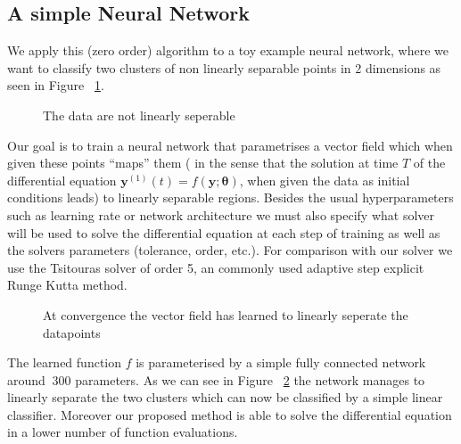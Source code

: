 \documentclass[11pt]{report}
\begin{document}
    \subsection{A simple Neural Network}
    We apply this (zero order) algorithm to a toy example neural network, where we want to classify two clusters of
    non linearly separable points in 2 dimensions as seen in Figure ~\ref{fig:moons}.

    \begin{figure}[H]
        \begin{center}
            \resizebox{\textwidth}{!}{  }
        \end{center}
        \caption{The data are not linearly seperable}
        \label{fig:moons}
    \end{figure}

    Our goal is to train a neural network that parametrises a vector field which when given these points ``maps'' them (
    in the sense that the solution at time $T$ of the differential equation
    $\pmb{y}^{(1)}(t) = f(\pmb{y}; \pmb{\theta})$, when given the data as initial conditions leads) to linearly separable regions.
    Besides the usual hyperparameters such as learning rate or network architecture we must also specify what solver will
    be used to solve the differential equation at each step of training as well as the solvers parameters
    (tolerance, order, etc.).
    For comparison with our solver we use the Tsitouras solver of order 5, an commonly used adaptive step explicit
    Runge Kutta method.

    \begin{figure}[H]
        \begin{center}
            \resizebox{\textwidth}{!}{  }
        \end{center}
        \caption{At convergence the vector field has learned to linearly seperate the datapoints}
        \label{fig:moons_sol}
    \end{figure}

    The learned function $f$ is parameterised by a simple fully connected network around $~300$ parameters.
    As we can see in Figure ~\ref{fig:moons_sol} the network manages to linearly separate the two clusters which can now be
    classified by a simple linear classifier.
    Moreover our proposed method is able to solve the differential equation in a lower number of function evaluations.
\end{document}

